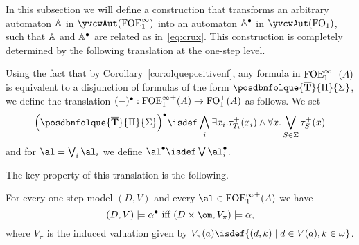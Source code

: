 
In this subsection we will define a construction that transforms an arbitrary automaton
$\mathbb{A}$ in $\yvcwAut(\olque)$ into an automaton $\mathbb{A}^{\bullet}$ in 
$\yvcwAut(\ofo)$, such that $\mathbb{A}$ and $\mathbb{A}^{\bullet}$ are related as 
in~\eqref{eq:crux}.
This construction is completely determined by the following translation at the
one-step level.

\begin{definition}
Using the fact
that by Corollary~\ref{cor:olquepositivenf}, any formula in ${\mathrm{FOE}^{\infty}_1}^+(A)$ is 
equivalent to a disjunction of formulas of the form 
$\posdbnfolque{\vlist{T}}{\Pi}{\Sigma}$, we define the translation 
$(-)^{\bullet} : {\mathrm{FOE}^{\infty}_1}^+(A) \to \mathrm{FO}_1^+(A)$ as follows.
We set
\[
\Big( \posdbnfolque{\vlist{T}}{\Pi}{\Sigma} \Big)^{\bullet} \isdef
\bigwedge_{i} \exists x_i. \tau^+_{T_i}(x_i) \land \forall x. \bigvee_{S\in\Sigma} \tau^+_S(x)
\]
and for $\al = \bigvee_{i} \al_{i}$ we define $\al^{\bullet} \isdef \bigvee 
\al_{i}^{\bullet}$.
\end{definition}

The key property of this translation is the following.

\begin{proposition}
\label{p-1P}
For every one-step model $(D,V)$ and every $\al \in {\olque}^+(A)$ we have
\begin{equation}
\label{eq-1cr}
(D,V) \models \alpha^{\bullet} \text{ iff } (D\times \om,V_\pi) \models \alpha,
\end{equation}
where $V_{\pi}$ %
 is the induced valuation given by 
$V_{\pi}(a) \isdef \{ (d,k) \mid d \in V(a), k\in\omega\}$.
\end{proposition}

